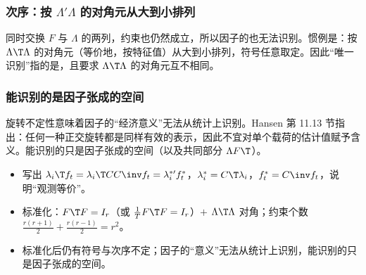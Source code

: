 \subsubsection{次序：按 \texorpdfstring{$\Lambda'\Lambda$}{Lambda'Lambda} 的对角元从大到小排列}

同时交换 $F$ 与 $\Lambda$ 的两列，约束也仍然成立，所以因子的也无法识别。惯例是：按 $\Lambda\T\Lambda$ 的对角元（等价地，按特征值）从大到小排列，符号任意取定。因此“唯一识别”指的是，且要求 $\Lambda\T\Lambda$ 的对角元互不相同。

\subsubsection{能识别的是因子张成的空间}

旋转不定性意味着因子的“经济意义”无法从统计上识别。Hansen 第 11.13 节指出：任何一种正交旋转都是同样有效的表示，因此不宜对单个载荷的估计值赋予含义。能识别的只是因子张成的空间（以及共同部分 $\Lambda F\T$）。

\begin{keypt}[识别的必记结论]
\begin{itemize}
\item 写出 $\lambda_i\T f_t=\lambda_i\T CC\inv f_t=\lambda_i^{*\prime}f_t^*$，$\lambda_i^*=C\T\lambda_i$，$f_t^*=C\inv f_t$，说明“观测等价”。
\item 标准化：$F\T F=I_r$（或 $\frac1TF\T F=I_r$）$+$ $\Lambda\T\Lambda$ 对角；约束个数 $\frac{r(r+1)}2+\frac{r(r-1)}2=r^2$。
\item 标准化后仍有符号与次序不定；因子的“意义”无法从统计上识别，能识别的只是因子张成的空间。
\end{itemize}
\end{keypt}

